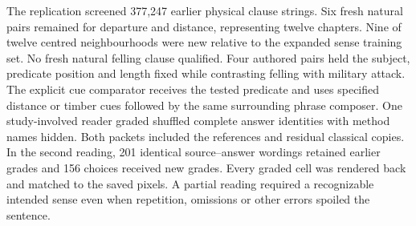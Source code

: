 The replication screened 377,247 earlier physical clause strings. Six fresh natural pairs remained for departure and distance, representing twelve chapters. Nine of twelve centred neighbourhoods were new relative to the expanded sense training set. No fresh natural felling clause qualified. Four authored pairs held the subject, predicate position and length fixed while contrasting felling with military attack. The explicit cue comparator receives the tested predicate and uses specified distance or timber cues followed by the same surrounding phrase composer. One study-involved reader graded shuffled complete answer identities with method names hidden. Both packets included the references and residual classical copies. In the second reading, 201 identical source--answer wordings retained earlier grades and 156 choices received new grades. Every graded cell was rendered back and matched to the saved pixels. A partial reading required a recognizable intended sense even when repetition, omissions or other errors spoiled the sentence.
